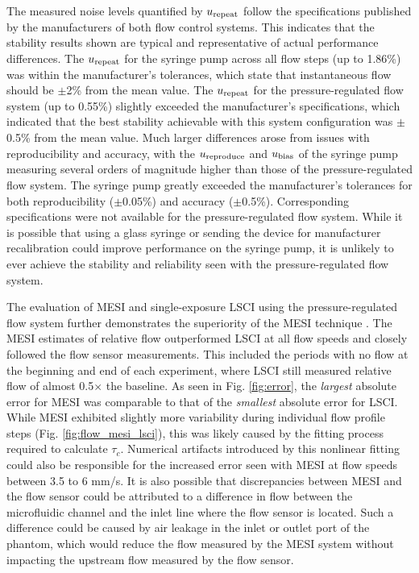 \documentclass[12pt]{spieman}
\begin{document}
\begin{spacing}{2}
The measured noise levels quantified by $u_\textnormal{repeat}$ follow the specifications published by the manufacturers of both flow control systems. This indicates that the stability results shown are typical and representative of actual performance differences. The $u_\textnormal{repeat}$ for the syringe pump across all flow steps (up to 1.86\%) was within the manufacturer's tolerances, which state that instantaneous flow should be $\pm$2\% from the mean value. The $u_\textnormal{repeat}$ for the pressure-regulated flow system (up to 0.55\%) slightly exceeded the manufacturer's specifications, which indicated that the best stability achievable with this system configuration was $\pm$0.5\% from the mean value. Much larger differences arose from issues with reproducibility and accuracy, with the $u_\textnormal{reproduce}$ and $u_\textnormal{bias}$ of the syringe pump measuring several orders of magnitude higher than those of the pressure-regulated flow system. The syringe pump greatly exceeded the manufacturer's tolerances for both reproducibility ($\pm$0.05\%) and accuracy ($\pm$0.5\%). Corresponding specifications were not available for the pressure-regulated flow system. While it is possible that using a glass syringe \cite{Zhou:2011ey} or sending the device for manufacturer recalibration could improve performance on the syringe pump, it is unlikely to ever achieve the stability and reliability seen with the pressure-regulated flow system.

The evaluation of MESI and single-exposure LSCI using the pressure-regulated flow system further demonstrates the superiority of the MESI technique \cite{Kazmi:2013hp}. The MESI estimates of relative flow outperformed LSCI at all flow speeds and closely followed the flow sensor measurements. This included the periods with no flow at the beginning and end of each experiment, where LSCI still measured relative flow of almost 0.5$\times$ the baseline. As seen in Fig. \ref{fig:error}, the \textit{largest} absolute error for MESI was comparable to that of the \textit{smallest} absolute error for LSCI. While MESI exhibited slightly more variability during individual flow profile steps (Fig. \ref{fig:flow_mesi_lsci}), this was likely caused by the fitting process required to calculate $\tau_c$. Numerical artifacts introduced by this nonlinear fitting could also be responsible for the increased error seen with MESI at flow speeds between 3.5 to 6 mm/s. It is also possible that discrepancies between MESI and the flow sensor could be attributed to a difference in flow between the microfluidic channel and the inlet line where the flow sensor is located. Such a difference could be caused by air leakage in the inlet or outlet port of the phantom, which would reduce the flow measured by the MESI system without impacting the upstream flow measured by the flow sensor.


\end{spacing}
\end{document}

